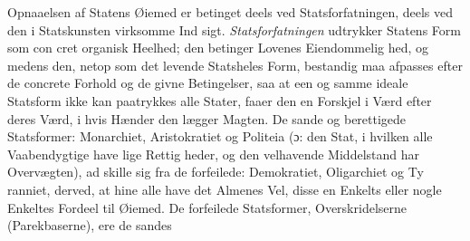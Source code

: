 \documentclass[12pt,a4paper]{book}
\begin{document}
Opnaaelsen af Statens Øiemed er betinget deels ved
Statsforfatningen, deels ved den i Statskunsten virksomme Ind\-%
sigt. \emph{Statsforfatningen} udtrykker Statens Form som con\-%
cret organisk Heelhed; den betinger Lovenes Eiendommelig\-%
hed, og medens den, netop som det levende Statsheles Form,
bestandig maa afpasses efter de concrete Forhold og de givne
Betingelser, saa at een og samme ideale Statsform ikke kan
paatrykkes alle Stater, faaer den en Forskjel i Værd efter
deres Værd, i hvis Hænder den lægger Magten. De sande og
berettigede Statsformer: Monarchiet, Aristokratiet og Politeia
(ɔ: den Stat, i hvilken alle Vaabendygtige have lige Rettig\-%
heder, og den velhavende Middelstand har Overvægten), ad\-%
skille sig fra de forfeilede: Demokratiet, Oligarchiet og Ty\-%
ranniet, derved, at hine alle have det Almenes Vel, disse en
Enkelts eller nogle Enkeltes Fordeel til Øiemed. De forfeilede
Statsformer, Overskridelserne (Parekbaserne), ere de sandes
\end{document}
